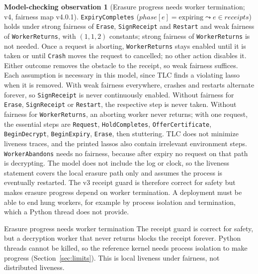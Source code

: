 \documentclass[pdflatex,sn-mathphys-num]{sn-jnl}
\theoremstyle{plain}
\theoremstyle{definition}
\newtheorem{observation}{Model-checking observation}
\newcommand{\code}[1]{\texttt{#1}}
\begin{document}
\begin{observation}[Erasure progress needs worker termination; v4, fairness map v4.0.1]\label{obs:liveness}
\code{ExpiryCompletes} ($\mathit{phase}[e]=\text{expiring}\leadsto e\in\mathit{receipts}$) holds under strong fairness of \code{Erase}, \code{SignReceipt} and \code{Restart} and weak fairness of \code{WorkerReturns}, with $(1,1,2)$ constants; strong fairness of \code{WorkerReturns} is not needed. Once a request is aborting, \code{WorkerReturns} stays enabled until it is taken or until \code{Crash} moves the request to cancelled; no other action disables it. Either outcome removes the obstacle to the receipt, so weak fairness suffices. Each assumption is necessary in this model, since TLC finds a violating lasso when it is removed. With weak fairness everywhere, crashes and restarts alternate forever, so \code{SignReceipt} is never continuously enabled. Without fairness for \code{Erase}, \code{SignReceipt} or \code{Restart}, the respective step is never taken. Without fairness for \code{WorkerReturns}, an aborting worker never returns; with one request, the essential steps are \code{Request}, \code{HoldCompletes}, \code{OfferCertificate}, \code{BeginDecrypt}, \code{BeginExpiry}, \code{Erase}, then stuttering. TLC does not minimize liveness traces, and the printed lassos also contain irrelevant environment steps. \code{WorkerAbandons} needs no fairness, because after expiry no request on that path is decrypting. The model does not include the log or clock, so the liveness statement covers the local erasure path only and assumes the process is eventually restarted. The v3 receipt guard is therefore correct for safety but makes erasure progress depend on worker termination. A deployment must be able to end hung workers, for example by process isolation and termination, which a Python thread does not provide.
\end{observation}

\begin{warnbox}{Erasure progress needs worker termination}
The receipt guard is correct for safety, but a decryption worker that never returns blocks the receipt forever. Python threads cannot be killed, so the reference kernel needs process isolation to make progress (Section~\ref{sec:limits}). This is local liveness under fairness, not distributed liveness.
\end{warnbox}
\end{document}
